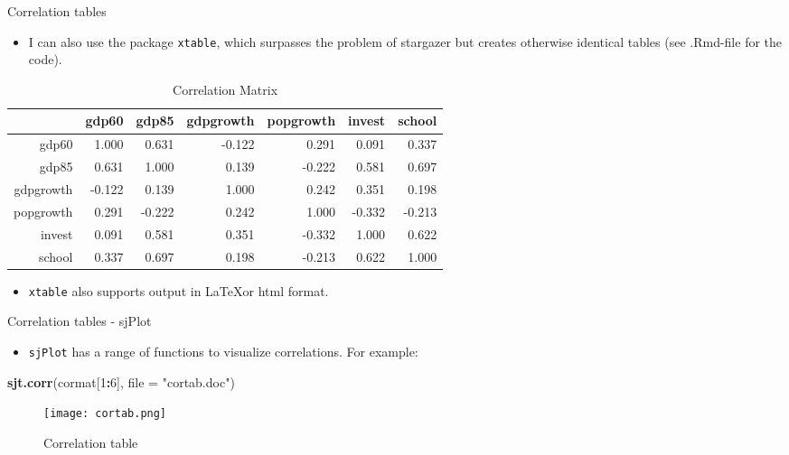 \documentclass[
  10pt,
  ignorenonframetext,
]{beamer}
\newenvironment{Shaded}{\begin{snugshade}}{\end{snugshade}}
\newcommand{\DataTypeTok}[1]{\textcolor[rgb]{0.13,0.29,0.53}{#1}}
\newcommand{\DecValTok}[1]{\textcolor[rgb]{0.00,0.00,0.81}{#1}}
\newcommand{\KeywordTok}[1]{\textcolor[rgb]{0.13,0.29,0.53}{\textbf{#1}}}
\newcommand{\NormalTok}[1]{#1}
\newcommand{\OperatorTok}[1]{\textcolor[rgb]{0.81,0.36,0.00}{\textbf{#1}}}
\newcommand{\StringTok}[1]{\textcolor[rgb]{0.31,0.60,0.02}{#1}}
\providecommand{\tightlist}{%
  \setlength{\itemsep}{0pt}\setlength{\parskip}{0pt}}
\begin{document}
\begin{frame}[fragile]{Correlation tables}
\protect\hypertarget{correlation-tables-1}{}

\begin{itemize}
\tightlist
\item
  I can also use the package \texttt{xtable}, which surpasses the
  problem of stargazer but creates otherwise identical tables (see
  .Rmd-file for the code).
\end{itemize}

\begin{table}[ht]
\centering
\begin{tabular}{rrrrrrr}
  \hline
 & gdp60 & gdp85 & gdpgrowth & popgrowth & invest & school \\ 
  \hline
gdp60 & 1.000 & 0.631 & -0.122 & 0.291 & 0.091 & 0.337 \\ 
  gdp85 & 0.631 & 1.000 & 0.139 & -0.222 & 0.581 & 0.697 \\ 
  gdpgrowth & -0.122 & 0.139 & 1.000 & 0.242 & 0.351 & 0.198 \\ 
  popgrowth & 0.291 & -0.222 & 0.242 & 1.000 & -0.332 & -0.213 \\ 
  invest & 0.091 & 0.581 & 0.351 & -0.332 & 1.000 & 0.622 \\ 
  school & 0.337 & 0.697 & 0.198 & -0.213 & 0.622 & 1.000 \\ 
   \hline
\end{tabular}
\caption{Correlation Matrix} 
\end{table}

\begin{itemize}
\tightlist
\item
  \texttt{xtable} also supports output in \LaTeX or html format.
\end{itemize}

\end{frame}

\begin{frame}[fragile]{Correlation tables - sjPlot}
\protect\hypertarget{correlation-tables---sjplot}{}

\begin{itemize}
\tightlist
\item
  \texttt{sjPlot} has a range of functions to visualize correlations.
  For example:
\end{itemize}

\begin{Shaded}
\begin{Highlighting}[]
\KeywordTok{sjt.corr}\NormalTok{(cormat[}\DecValTok{1}\OperatorTok{:}\DecValTok{6}\NormalTok{], }\DataTypeTok{file =} \StringTok{"cortab.doc"}\NormalTok{)}
\end{Highlighting}
\end{Shaded}

\begin{figure}
\centering
\texttt{[image: cortab.png]}
\caption{Correlation table}
\end{figure}

\end{frame}
\end{document}
